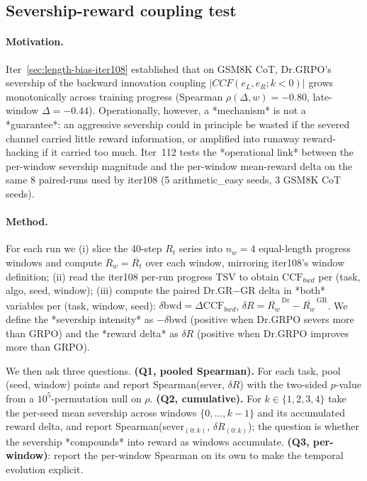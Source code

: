 
\subsection{Severship-reward coupling test}
\label{sec:length-bias-iter112}

\paragraph{Motivation.}
Iter~\ref{sec:length-bias-iter108} established that on GSM8K CoT,
Dr.GRPO's severship of the backward innovation coupling
$|CCF(e_L,e_R;k<0)|$ grows monotonically across training progress
(Spearman $\rho(\Delta,w)=-0.80$, late-window
$\Delta=-0.44$).  Operationally, however, a *mechanism* is not a
*guarantee*: an aggressive severship could in principle be wasted if
the severed channel carried little reward information, or amplified
into runaway reward-hacking if it carried too much.  Iter~112 tests
the *operational link* between the per-window severship magnitude and
the per-window mean-reward delta on the same 8 paired-runs used by
iter108 (5 arithmetic\_easy seeds, 3 GSM8K CoT seeds).

\paragraph{Method.}
For each run we (i) slice the 40-step $R_t$ series into $n_w=4$
equal-length progress windows and compute
$R_w = \overline{R_t}$ over each window, mirroring iter108's window
definition; (ii) read the iter108 per-run progress TSV to obtain
$\mathrm{CCF}_{bwd}$ per (task, algo, seed, window); (iii) compute the
paired Dr.GR$-$GR delta in *both* variables per (task, window, seed):
$\delta\mathrm{bwd} = \Delta\mathrm{CCF}_{bwd}$,
$\delta R = \overline{R_w}^{\,\mathrm{Dr}}-\overline{R_w}^{\,\mathrm{GR}}$.
We define the *severship intensity* as $-\delta\mathrm{bwd}$ (positive
when Dr.GRPO severs more than GRPO) and the *reward delta* as
$\delta R$ (positive when Dr.GRPO improves more than GRPO).

We then ask three questions.  \textbf{(Q1, pooled Spearman).}  For
each task, pool (seed, window) points and report Spearman(sever,
$\delta R$) with the two-sided $p$-value from a
$10^5$-permutation null on $\rho$.  \textbf{(Q2, cumulative).}
For $k\in\{1,2,3,4\}$ take the per-seed mean severship across
windows $\{0,\ldots,k\!-\!1\}$ and its accumulated reward delta,
and report Spearman(sever$_{(0:k)}$, $\delta R_{(0:k)}$); the question
is whether the severship *compounds* into reward as windows
accumulate.  \textbf{(Q3, per-window)}: report the per-window
Spearman on its own to make the temporal evolution explicit.

